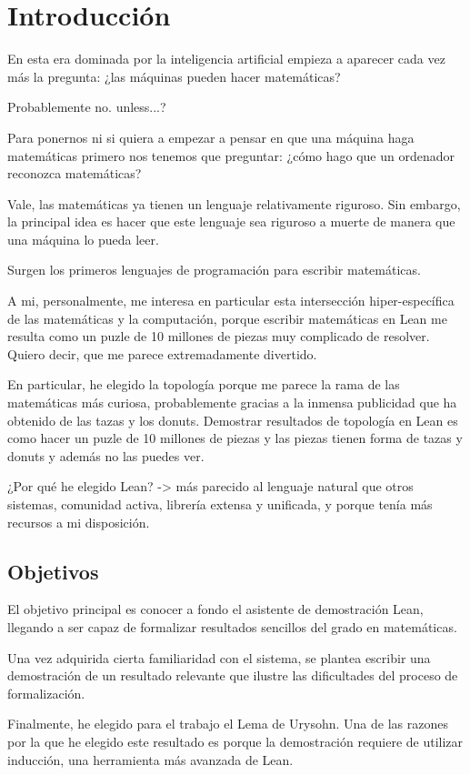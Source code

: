 \section{Introducción}

En esta era dominada por la inteligencia artificial empieza a aparecer cada vez más la pregunta: ¿las máquinas pueden hacer matemáticas?

Probablemente no. unless...?

Para ponernos ni si quiera a empezar a pensar en que una máquina haga matemáticas primero nos tenemos que preguntar: ¿cómo hago que un ordenador reconozca matemáticas?

Vale, las matemáticas ya tienen un lenguaje relativamente riguroso. Sin embargo, la principal idea es hacer que este lenguaje sea riguroso a muerte de manera que una máquina lo pueda leer.

Surgen los primeros lenguajes de programación para escribir matemáticas.

A mi, personalmente, me interesa en particular esta intersección hiper-específica de las matemáticas y la computación, porque escribir matemáticas en Lean me resulta como un puzle de 10 millones de piezas muy complicado de resolver. Quiero decir, que me parece extremadamente divertido.

En particular, he elegido la topología porque me parece la rama de las matemáticas más curiosa, probablemente gracias a la inmensa publicidad que ha obtenido de las tazas y los donuts. Demostrar resultados de topología en Lean es como hacer un puzle de 10 millones de piezas y las piezas tienen forma de tazas y donuts y además no las puedes ver.

¿Por qué he elegido Lean? -> más parecido al lenguaje natural que otros sistemas, comunidad activa, librería extensa y unificada, y porque tenía más recursos a mi disposición.

\subsection{Objetivos}

El objetivo principal es conocer a fondo el asistente de demostración Lean, llegando a ser capaz de formalizar resultados sencillos del grado en matemáticas.

Una vez adquirida cierta familiaridad con el sistema, se plantea escribir una demostración de un resultado relevante que ilustre las dificultades del proceso de formalización.

Finalmente, he elegido para el trabajo el Lema de Urysohn. Una de las razones por la que he elegido este resultado es porque la demostración requiere de utilizar inducción, una herramienta más avanzada de Lean.

